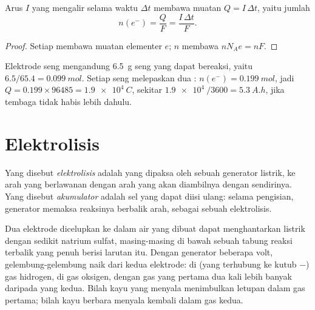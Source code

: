 \begin{proposition}\label{prop:g12:cells-and-electrolysis:charge}
Arus $I$ yang mengalir selama waktu $\Delta t$ membawa muatan
$Q = I\,\Delta t$, yaitu jumlah 
\[
  n(e^-) = \frac{Q}{F} = \frac{I\,\Delta t}{F} .
\]
\end{proposition}

\begin{proof}
Setiap  membawa muatan elementer $e$; $n$   membawa
$n N_A e = n F$.
\end{proof}

\begin{example}\label{ex:g12:cells-and-electrolysis:capacity}
Elektrode seng mengandung \qty{6.5}{g} seng yang dapat bereaksi, yaitu
$6.5/65.4 = \qty{0.099}{mol}$. Setiap  seng melepaskan dua
: $n(e^-) = \qty{0.199}{mol}$, jadi
$Q = 0.199 \times 96485 = \qty{1.9e4}{C}$, sekitar
$\qty{1.9e4}{}/3600 = \qty{5.3}{A.h}$, jika  tembaga tidak habis
lebih dahulu.
\end{example}

\section{Elektrolisis}

\begin{definition}\label{def:g12:cells-and-electrolysis:electrolysis}
Yang disebut \emph{elektrolisis} adalah  yang dipaksa oleh sebuah generator listrik, ke arah yang
berlawanan dengan arah yang akan diambilnya dengan sendirinya. Yang
disebut \emph{akumulator} adalah sel yang dapat diisi
ulang: selama pengisian, generator memaksa reaksinya berbalik arah,
sebagai sebuah elektrolisis.
\end{definition}

\begin{inthelab}
Dua elektrode dicelupkan ke dalam air yang dibuat dapat menghantarkan
listrik dengan sedikit natrium sulfat, masing-masing di bawah sebuah
tabung reaksi terbalik yang penuh berisi larutan itu. Dengan generator
beberapa volt, gelembung-gelembung naik dari kedua elektrode: di 
(yang terhubung ke kutub $-$) gas hidrogen, di  gas oksigen, dengan
gas yang pertama dua kali lebih banyak daripada yang kedua. Bilah kayu
yang menyala menimbulkan letupan dalam gas pertama; bilah kayu berbara
menyala kembali dalam gas kedua.
\end{inthelab}

